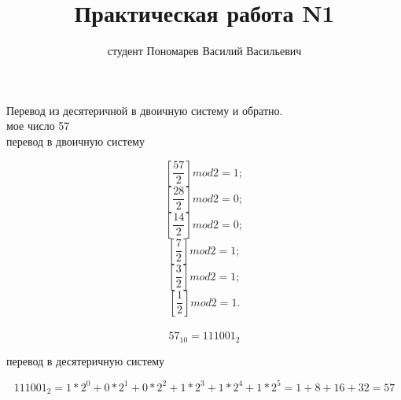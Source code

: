 \documentclass[a4paper,11pt]{article}
\title{Практическая работа N1}
\author{студент Пономарев Василий Васильевич}
\begin{document}
\maketitle
\begin{center}
Перевод из десятеричной в двоичную систему и обратно.\\
мое число 57\\
перевод в двоичную систему
\end{center}
\[ 
\left[ \frac{57}{2} \right] mod2=1;
\]
\[ 
\left[ \frac{28}{2} \right] mod2=0;
\]
\[ 
\left[ \frac{14}{2} \right] mod2=0;
\]
\[ 
\left[ \frac{7}{2} \right] mod2=1;
\]
\[ 
\left[ \frac{3}{2} \right] mod2=1;
\]
\[ 
\left[ \frac{1}{2} \right] mod2=1.
\]
\\
\[
57_{10} = 111001_{2}
\]
\begin{center}
перевод в десятеричную систему
\end{center}
\[
111001_2=1*2^0+0*2^1+0*2^2+1*2^3+1*2^4+1*2^5=1+8+16+32=57
\]
\end{document}
